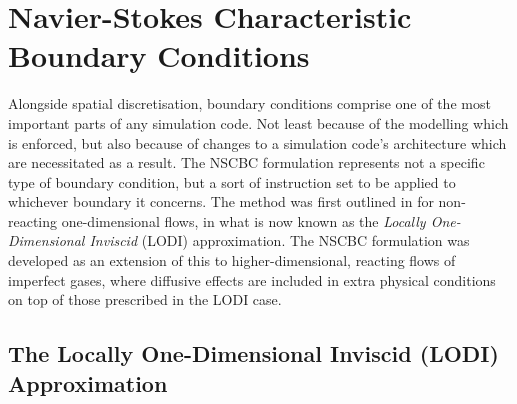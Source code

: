 \section[NSCBC]{Navier-Stokes Characteristic Boundary Conditions} \label{sec:NSCBC}

Alongside spatial discretisation, boundary conditions comprise one of the most important parts of any simulation code. Not least because of the modelling which is enforced, but also because of changes to a simulation code's architecture which are necessitated as a result. The NSCBC \cite{poinsot1992BoundaryConditionsDirect,poinsot2001TheoreticalNumericalCombustion} formulation represents not a specific type of boundary condition, but a sort of instruction set to be applied to whichever boundary it concerns. The method was first outlined in \cite{thompson1987TimeDependentBoundary,thompson1987LecturesSeriesComputational,thompson1990TimeDependentBoundaryConditions} for non-reacting one-dimensional flows, in what is now known as the \emph{Locally One-Dimensional Inviscid} (LODI) approximation. The NSCBC formulation was developed as an extension of this to higher-dimensional, reacting flows of imperfect gases, where diffusive effects are included in extra physical conditions on top of those prescribed in the LODI case.


\subsection{The Locally One-Dimensional Inviscid (LODI) Approximation} \label{sec:LODI}


